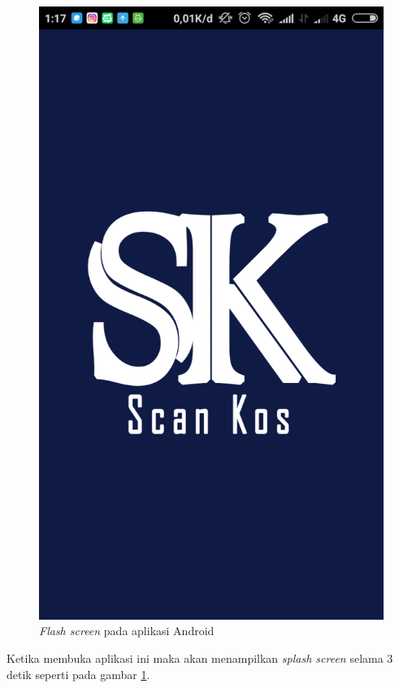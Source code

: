 		\begin{figure}[H]
			\centering
			\includegraphics[scale=0.25]{gambar/and/1}
			\caption{\textit{Flash screen} pada aplikasi Android}
			\label{and1}
		\end{figure}
	
		Ketika membuka aplikasi ini maka akan menampilkan \textit{splash screen} selama 3 detik seperti pada gambar \ref{and1}. 
		
